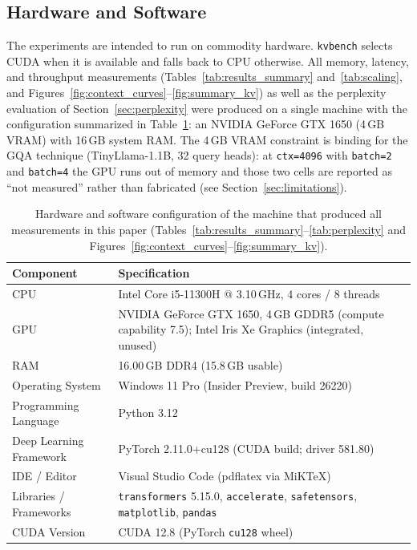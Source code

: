 \documentclass[conference]{IEEEtran}
\begin{document}
\subsection{Hardware and Software}
\label{sec:hardware}

The experiments are intended to run on commodity hardware. \texttt{kvbench} selects CUDA when it is available and falls back to CPU otherwise. All memory, latency, and throughput measurements (Tables~\ref{tab:results_summary} and~\ref{tab:scaling}, and Figures~\ref{fig:context_curves}--\ref{fig:summary_kv}) as well as the perplexity evaluation of Section~\ref{sec:perplexity} were produced on a single machine with the configuration summarized in Table~\ref{tab:hardware}: an NVIDIA GeForce GTX 1650 (4\,GB VRAM) with 16\,GB system RAM. The 4\,GB VRAM constraint is binding for the GQA technique (TinyLlama-1.1B, 32 query heads): at \texttt{ctx=4096} with \texttt{batch=2} and \texttt{batch=4} the GPU runs out of memory and those two cells are reported as ``not measured'' rather than fabricated (see Section~\ref{sec:limitations}).

\begin{table}[htbp]
	\centering
	\caption{Hardware and software configuration of the machine that produced all measurements in this paper (Tables~\ref{tab:results_summary}--\ref{tab:perplexity} and Figures~\ref{fig:context_curves}--\ref{fig:summary_kv}).}
	\label{tab:hardware}
	\small
	\begin{tabularx}{\linewidth}{lX}
		\toprule
		\textbf{Component}        & \textbf{Specification}                                  \\
		\midrule
		CPU                       & Intel Core {i5-11300H} @ 3.10\,GHz, 4 cores / 8 threads \\
		\midrule
		GPU                       & NVIDIA GeForce GTX 1650, 4\,GB GDDR5 (compute capability 7.5); Intel Iris Xe Graphics (integrated, unused) \\
		\midrule
		RAM                       & 16.00\,GB DDR4 (15.8\,GB usable) \\
		\midrule
		Operating System          & Windows 11 Pro (Insider Preview, build 26220) \\
		\midrule
		Programming Language      & Python 3.12                                            \\
		\midrule
		Deep Learning Framework   & PyTorch 2.11.0+cu128 (CUDA build; driver 581.80) \\
		\midrule
		IDE / Editor              & Visual Studio Code (pdflatex via MiKTeX) \\
		\midrule
		Libraries / Frameworks    & \texttt{transformers} 5.15.0, \texttt{accelerate}, \texttt{safetensors}, \texttt{matplotlib}, \texttt{pandas} \\
		\midrule
		CUDA Version              & CUDA 12.8 (PyTorch \texttt{cu128} wheel) \\
		\bottomrule
	\end{tabularx}
\end{table}
\end{document}

